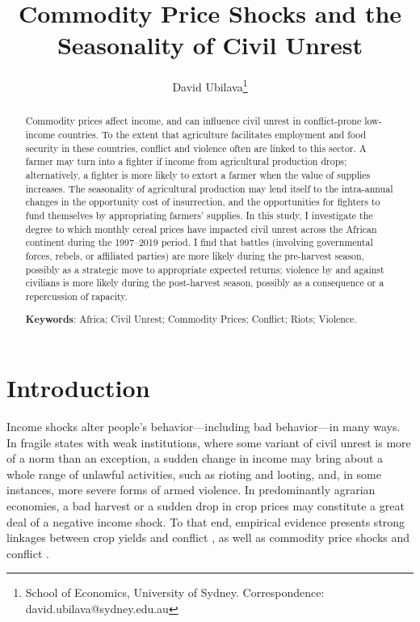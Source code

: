 \documentclass[11pt]{article}
\title{Commodity Price Shocks and the Seasonality of Civil Unrest}
\author{David Ubilava\thanks{School of Economics, University of Sydney. Correspondence: david.ubilava@sydney.edu.au}}
\begin{document}
\begin{titlepage}
	
	\maketitle
	\thispagestyle{empty}
	
	\begin{abstract}
		
		\noindent Commodity prices affect income, and can influence civil unrest in conflict-prone low-income countries. To the extent that agriculture facilitates employment and food security in these countries, conflict and violence often are linked to this sector. A farmer may turn into a fighter if income from agricultural production drops; alternatively, a fighter is more likely to extort a farmer when the value of supplies increases. The seasonality of agricultural production may lend itself to the intra-annual changes in the opportunity cost of insurrection, and the opportunities for fighters to fund themselves by appropriating farmers' supplies. In this study, I investigate the degree to which monthly cereal prices have impacted civil unrest across the African continent during the 1997--2019 period. I find that battles (involving governmental forces, rebels, or affiliated parties) are more likely during the pre-harvest season, possibly as a strategic move to appropriate expected returns; violence by and against civilians is more likely during the post-harvest season, possibly as a consequence or a repercussion of rapacity. 
		
		\medskip
		
		\noindent\textbf{Keywords}: Africa; Civil Unrest; Commodity Prices; Conflict; Riots; Violence.
		
	\end{abstract}

\end{titlepage}

\section{Introduction}

Income shocks alter people's behavior---including bad behavior---in many ways. In fragile states with weak institutions, where some variant of civil unrest is more of a norm than an exception, a sudden change in income may bring about a whole range of unlawful activities, such as rioting and looting, and, in some instances, more severe forms of armed violence. In predominantly agrarian economies, a bad harvest or a sudden drop in crop prices may constitute a great deal of a negative income shock. To that end, empirical evidence presents strong linkages between crop yields and conflict \citep{buhaug2015,koren2017,koren2018}, as well as commodity price shocks and conflict \citep{maystadt2014,smith2014,berman2015,fjelde2015,raleigh2015,crost2020,mcguirk2020}. 
\end{document}
